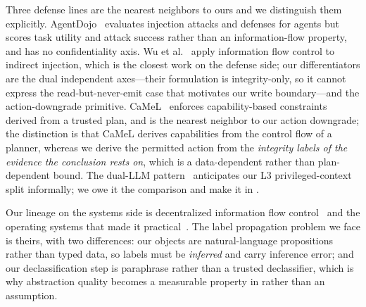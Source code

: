 Three defense lines are the nearest neighbors to ours and we distinguish them
explicitly. AgentDojo~\cite{debenedetti2024agentdojo} evaluates injection
attacks and defenses for agents but scores task utility and attack success
rather than an information-flow property, and has no confidentiality axis.
Wu et al.~\cite{wu2024system} apply information flow control to indirect
injection, which is the closest work on the defense side; our differentiators
are the dual independent axes---their formulation is integrity-only, so it
cannot express the read-but-never-emit case that motivates our write
boundary---and the action-downgrade primitive.
CaMeL~\cite{camel2025} enforces capability-based constraints derived from a
trusted plan, and is the nearest neighbor to our action downgrade; the
distinction is that CaMeL derives capabilities from the control flow of a
planner, whereas we derive the permitted action from the \emph{integrity labels
of the evidence the conclusion rests on}, which is a data-dependent rather than
plan-dependent bound. The dual-LLM pattern~\cite{willison2023dual} anticipates
our L3 privileged-context split informally; we owe it the comparison and make
it in .

Our lineage on the systems side is decentralized information flow
control~\cite{myers1997decentralized} and the operating systems that
made it practical~\cite{zeldovich2006histar,krohn2007flume}. The label
propagation problem we face is theirs, with two differences: our objects are
natural-language propositions rather than typed data, so labels must be
\emph{inferred} and carry inference error; and our declassification step is
paraphrase rather than a trusted declassifier, which is why abstraction quality
becomes a measurable property in  rather than an assumption.
